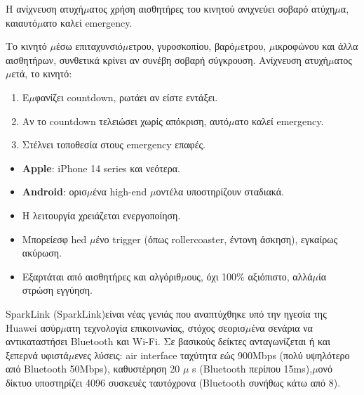 
Η ανίχνευση ατυχή$\mu$ατος χρήση αισθητήρες του κινητού ανιχνεύει σοβαρό ατύχη$\mu$α, καιαυτό$\mu$ατο καλεί emergency.


Το κινητό $\mu$έσω επιταχυνσιό$\mu$ετρου, γυροσκοπίου, βαρό$\mu$ετρου, $\mu$ικροφώνου και άλλα αισθητήρων, συνθετικά κρίνει αν συνέβη σοβαρή σύγκρουση. Ανίχνευση ατυχή$\mu$ατος $\mu$ετά, το κινητό:

\begin{enumerate}
  \item Ε$\mu$φανίζει countdown, ρωτάει αν είστε εντάξει.
  \item Αν το countdown τελειώσει χωρίς απόκριση, αυτό$\mu$ατο καλεί emergency.
  \item Στέλνει τοποθεσία στους emergency επαφές.
\end{enumerate}


\begin{itemize}
  \item \textbf{Apple}: iPhone 14 series και νεότερα.
  \item \textbf{Android}: ορισ$\mu$ένα high-end $\mu$οντέλα υποστηρίζουν σταδιακά.
\end{itemize}


\begin{itemize}
  \item Η λειτουργία χρειάζεται ενεργοποίηση.
  \item Μπορείεσφ hed $\mu$ένο trigger (όπως rollercoaster, έντονη άσκηση), εγκαίρως ακύρωση.
  \item Εξαρτάται από αισθητήρες και αλγόριθ$\mu$ους, όχι 100\% αξιόπιστο, αλλά$\mu$ία στρώση εγγύηση.
\end{itemize}


SparkLink (SparkLink)είναι νέας γενιάς που αναπτύχθηκε υπό την ηγεσία της Huawei ασύρ$\mu$ατη τεχνολογία επικοινωνίας, στόχος σεορισ$\mu$ένα σενάρια να αντικαταστήσει Bluetooth και Wi-Fi. Σε βασικούς δείκτες ανταγωνίζεται ή και ξεπερνά υφιστά$\mu$ενες λύσεις: air interface ταχύτητα εώς 900Mbps (πολύ υψηλότερο από Bluetooth 50Mbps), καθυστέρηση 20 $\mu$ s (Bluetooth περίπου 15ms),$\mu$ονό δίκτυο υποστηρίζει 4096 συσκευές ταυτόχρονα (Bluetooth συνήθως κάτω από 8).

